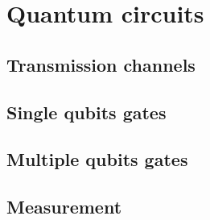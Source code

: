 \section{Quantum circuits}
\subsection{Transmission channels}
\subsection{Single qubits gates}
\subsection{Multiple qubits gates}
\subsection{Measurement}\label{sec:measurement}